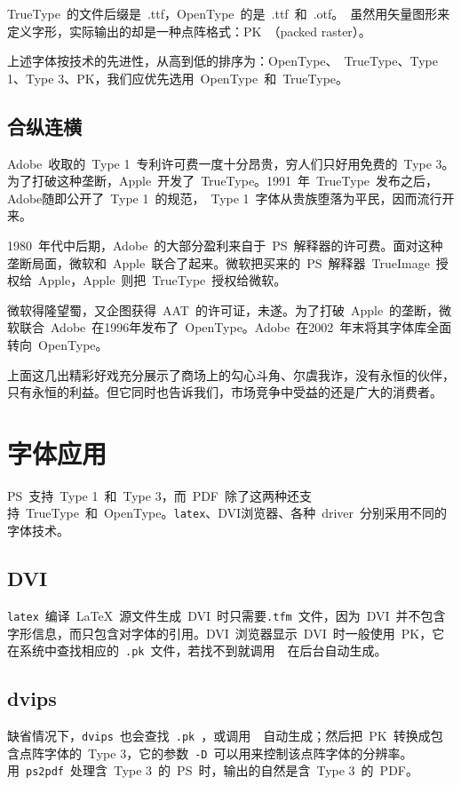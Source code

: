 TrueType~的文件后缀是~.ttf，OpenType~的是~.ttf~和~.otf。\MF~虽然用矢量图形来定义字形，实际输出的却是一种点阵格式：PK~（packed raster）。

上述字体按技术的先进性，从高到低的排序为：OpenType、~TrueType、Type 1、Type 3、PK，我们应优先选用~OpenType~和~TrueType。

\subsection{合纵连横}
Adobe~收取的~Type 1~专利许可费一度十分昂贵，穷人们只好用免费的~Type 3。为了打破这种垄断，Apple~开发了~TrueType。1991~年~TrueType~发布之后，Adobe随即公开了~Type 1~的规范，~Type 1~字体从贵族堕落为平民，因而流行开来。

1980~年代中后期，Adobe~的大部分盈利来自于~PS~解释器的许可费。面对这种垄断局面，微软和~Apple~联合了起来。微软把买来的~PS~解释器~TrueImage~授权给~Apple，Apple~则把~TrueType~授权给微软。

微软得隆望蜀，又企图获得~AAT~的许可证，未遂。为了打破~Apple~的垄断，微软联合~Adobe~在1996年发布了~OpenType。Adobe~在2002~年末将其字体库全面转向~OpenType。

上面这几出精彩好戏充分展示了商场上的勾心斗角、尔虞我诈，没有永恒的伙伴，只有永恒的利益。但它同时也告诉我们，市场竞争中受益的还是广大的消费者。

\section{字体应用}

PS~支持~Type 1~和~Type 3，而~PDF~除了这两种还支持~TrueType~和~OpenType。\verb|latex|、DVI浏览器、各种~driver~分别采用不同的字体技术。

\subsection{DVI}
\verb|latex|~编译~\LaTeX~源文件生成~DVI~时只需要\verb|.tfm|~文件，因为~DVI~并不包含字形信息，而只包含对字体的引用。DVI~浏览器显示~DVI~时一般使用~PK，它在系统中查找相应的~\verb|.pk|~文件，若找不到就调用~\MF~在后台自动生成。

\subsection{dvips}
缺省情况下，\verb|dvips|~也会查找~\verb|.pk|~，或调用~\MF~自动生成；然后把~PK~转换成包含点阵字体的~Type 3，它的参数~\verb|-D|~可以用来控制该点阵字体的分辨率。用~\verb|ps2pdf|~处理含~Type 3~的~PS~时，输出的自然是含~Type 3~的~PDF。


